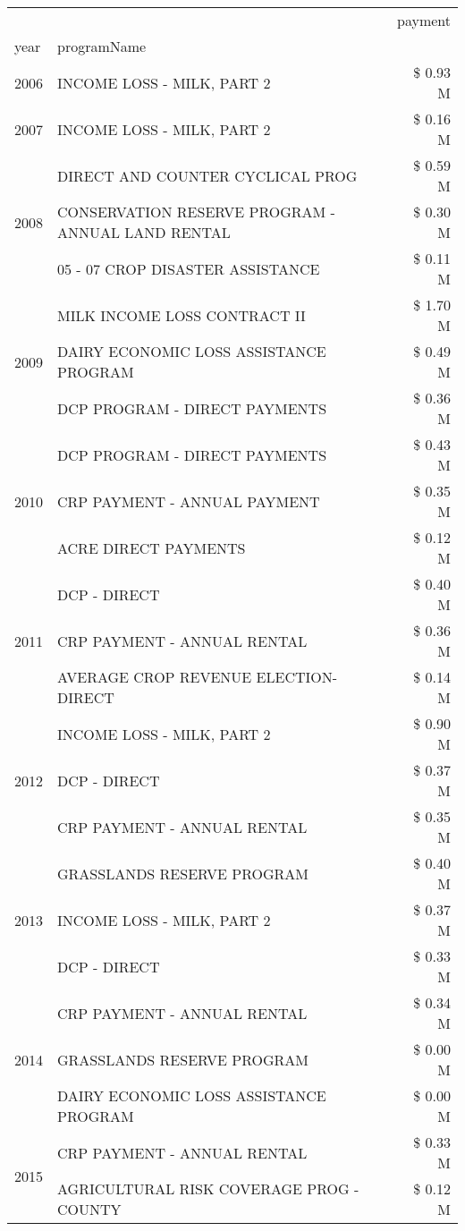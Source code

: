 \begin{tabular}{llr}
\toprule
 &  & payment \\
year & programName &  \\
\midrule
2006 & INCOME LOSS - MILK, PART 2 & \$ 0.93 M \\
\cline{1-3}
2007 & INCOME LOSS - MILK, PART 2 & \$ 0.16 M \\
\cline{1-3}
\multirow[t]{3}{*}{2008} & DIRECT AND COUNTER CYCLICAL PROG & \$ 0.59 M \\
 & CONSERVATION RESERVE PROGRAM - ANNUAL LAND RENTAL & \$ 0.30 M \\
 & 05 - 07 CROP DISASTER ASSISTANCE & \$ 0.11 M \\
\cline{1-3}
\multirow[t]{3}{*}{2009} & MILK INCOME LOSS CONTRACT II & \$ 1.70 M \\
 & DAIRY ECONOMIC LOSS ASSISTANCE PROGRAM & \$ 0.49 M \\
 & DCP PROGRAM - DIRECT PAYMENTS & \$ 0.36 M \\
\cline{1-3}
\multirow[t]{3}{*}{2010} & DCP PROGRAM - DIRECT PAYMENTS & \$ 0.43 M \\
 & CRP PAYMENT - ANNUAL PAYMENT & \$ 0.35 M \\
 & ACRE DIRECT PAYMENTS & \$ 0.12 M \\
\cline{1-3}
\multirow[t]{3}{*}{2011} & DCP - DIRECT & \$ 0.40 M \\
 & CRP PAYMENT - ANNUAL RENTAL & \$ 0.36 M \\
 & AVERAGE CROP REVENUE ELECTION-DIRECT & \$ 0.14 M \\
\cline{1-3}
\multirow[t]{3}{*}{2012} & INCOME LOSS - MILK, PART 2 & \$ 0.90 M \\
 & DCP - DIRECT & \$ 0.37 M \\
 & CRP PAYMENT - ANNUAL RENTAL & \$ 0.35 M \\
\cline{1-3}
\multirow[t]{3}{*}{2013} & GRASSLANDS RESERVE PROGRAM & \$ 0.40 M \\
 & INCOME LOSS - MILK, PART 2 & \$ 0.37 M \\
 & DCP - DIRECT & \$ 0.33 M \\
\cline{1-3}
\multirow[t]{3}{*}{2014} & CRP PAYMENT - ANNUAL RENTAL & \$ 0.34 M \\
 & GRASSLANDS RESERVE PROGRAM & \$ 0.00 M \\
 & DAIRY ECONOMIC LOSS ASSISTANCE PROGRAM & \$ 0.00 M \\
\cline{1-3}
\multirow[t]{3}{*}{2015} & CRP PAYMENT - ANNUAL RENTAL & \$ 0.33 M \\
 & AGRICULTURAL RISK COVERAGE PROG - COUNTY & \$ 0.12 M \\

\end{tabular}
